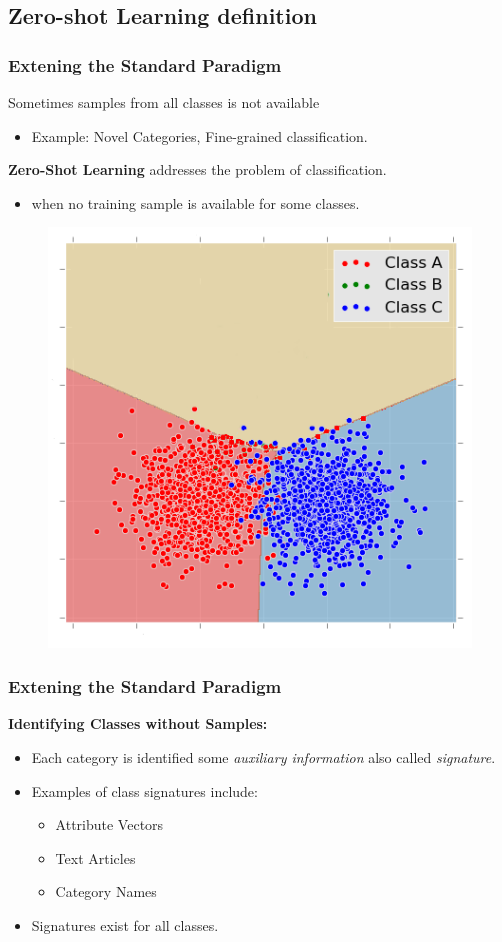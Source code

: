 \documentclass{beamer}
\begin{document}
\subsection{Zero-shot Learning definition}
\begin{frame}
  \frametitle{Extening the Standard Paradigm}
  Sometimes samples from all classes is not available
  \begin{itemize}
    \item Example: Novel Categories, Fine-grained classification.
  \end{itemize}

  \textbf{Zero-Shot Learning} addresses the problem of classification.
  \begin{itemize}
    \item[]  when no training sample is available for some classes.
  \end{itemize}
  \begin{figure}
  \includegraphics[width= 0.3\linewidth]{zero.png}
  \end{figure}
\end{frame}
\begin{frame}\frametitle{Extening the Standard Paradigm}
\textbf{Identifying Classes without Samples:}
\begin{itemize}
  \item Each category is identified some \textit{auxiliary information} also called
  \textit{signature}.
  \item Examples of class signatures include:
  \begin{itemize}
    \item Attribute Vectors
    \item Text Articles
    \item Category Names
  \end{itemize}
  \item Signatures exist for all classes.
\end{itemize}
\end{frame}
\end{document}
